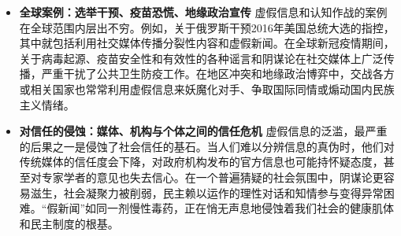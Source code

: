 \documentclass[UTF8, 10pt]{ctexbook}
\begin{document}
\begin{itemize}
    \item \textbf{全球案例：选举干预、疫苗恐慌、地缘政治宣传}
    虚假信息和认知作战的案例在全球范围内层出不穷。例如，关于俄罗斯干预2016年美国总统大选的指控，其中就包括利用社交媒体传播分裂性内容和虚假新闻。在全球新冠疫情期间，关于病毒起源、疫苗安全性和有效性的各种谣言和阴谋论在社交媒体上广泛传播，严重干扰了公共卫生防疫工作。在地区冲突和地缘政治博弈中，交战各方或相关国家也常常利用虚假信息来妖魔化对手、争取国际同情或煽动国内民族主义情绪。

    \item \textbf{对信任的侵蚀：媒体、机构与个体之间的信任危机}
    虚假信息的泛滥，最严重的后果之一是侵蚀了社会信任的基石。当人们难以分辨信息的真伪时，他们对传统媒体的信任度会下降，对政府机构发布的官方信息也可能持怀疑态度，甚至对专家学者的意见也失去信心。在一个普遍猜疑的社会氛围中，阴谋论更容易滋生，社会凝聚力被削弱，民主赖以运作的理性对话和知情参与变得异常困难。“假新闻”如同一剂慢性毒药，正在悄无声息地侵蚀着我们社会的健康肌体和民主制度的根基。
\end{itemize}
\end{document}

